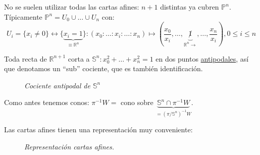 \begin{defi}
No se suelen utilizar todas las cartas afines: $n + 1$ distintas ya cubren $\mathbb{P}^{n}$. Típicamente $\mathbb{P}^{n} = U_0 \cup \ldots \cup U_n$ con:
\[
    U_i = \{x_i \neq 0\} \leftrightarrow \{\underbrace{x_i = 1}_{\equiv \mathbb{R}^n}\}: \left( x_0 : \ldots : x_i : \ldots : x_n \right) \mapsto \left( \frac{x_0}{x_i}, \ldots, \underbrace{\not1}_{\mathbb{R}^n \rightarrow}, \ldots, \frac{x_n}{x_i} \right), 0 \le i \le n
\]
\end{defi}

\begin{prop}
    Toda recta de $\mathbb{R}^{n + 1}$ corta a $\mathbb{S}^{n}: x_0^2 + \ldots + x_n^2 = 1$ en dos puntos \underline{antipodales}, así que denotamos un ``sub'' cociente, que es también identificación.
    \begin{figure}[H]
        \centering
        \caption{\textit{Cociente antipodal de $\mathbb{S}^n$}}
        \label{fig:cociente_antipodal_Sn}
    \end{figure}
\end{prop}
\begin{demo} 
    Como antes tenemos conos: $\pi^{-1}W = $ cono sobre $\underbrace{\mathbb{S}^n \cap \pi^{-1}W}_{= \left( \pi / \mathbb{S}^n \right)^{-1} W}$.
\end{demo}
\begin{obs}
    Las cartas afines tienen una representación muy conveniente:
    \begin{figure}[H]
        \centering
        \caption{\textit{Representación cartas afines.}}
        \label{fig:representacion-cartas-afines}
    \end{figure}
\end{obs}

